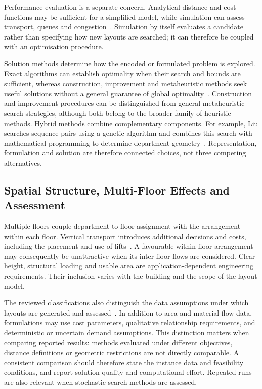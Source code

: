 \documentclass[10pt,a4paper]{article}
\begin{document}
Performance evaluation is a separate concern. Analytical distance and cost
functions may be sufficient for a simplified model, while simulation can assess
transport, queues and congestion\ \cite{perez2021,ahmadi2017}. Simulation by
itself evaluates a candidate rather than specifying how new layouts are
searched; it can therefore be coupled with an optimisation procedure.

Solution methods determine how the encoded or formulated problem is explored.
Exact algorithms can establish optimality when their search and bounds are
sufficient, whereas construction, improvement and metaheuristic methods seek
useful solutions without a general guarantee of global optimality\ \cite{drira2007}.
Construction and improvement procedures can be distinguished from general
metaheuristic search strategies, although both belong to the broader family
of heuristic methods.
Hybrid methods combine complementary components. For example, Liu searches
sequence-pairs using a genetic algorithm and combines this search with
mathematical programming to determine department geometry\ \cite{liu2004}.
Representation, formulation and solution are therefore connected choices,
not three competing alternatives.

\subsection{Spatial Structure, Multi-Floor Effects and Assessment}

Multiple floors couple department-to-floor assignment with the arrangement
within each floor. Vertical transport introduces additional decisions and costs,
including the placement and use of lifts\ \cite{ahmadi2017}. A favourable
within-floor arrangement may consequently be unattractive when its inter-floor
flows are considered. Clear height, structural loading and usable area are
application-dependent engineering requirements. Their inclusion varies with
the building and the scope of the layout model.

The reviewed classifications also distinguish the data assumptions under which
layouts are generated and assessed\ \cite{drira2007,perez2021}. In addition to
area and material-flow data, formulations may use cost parameters, qualitative
relationship requirements, and deterministic or uncertain demand assumptions.
This distinction matters when comparing reported results: methods evaluated
under different objectives, distance definitions or geometric restrictions
are not directly comparable. A consistent comparison should therefore state
the instance data and feasibility conditions, and report solution quality and
computational effort. Repeated runs are also relevant when stochastic search
methods are assessed.
\end{document}
